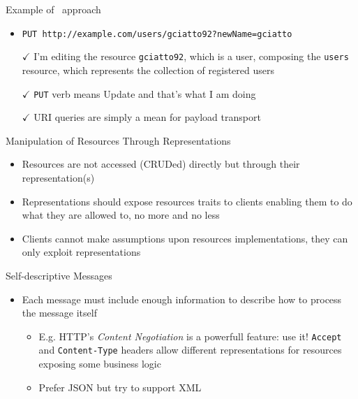 \begin{frame}
	\begin{exampleblock}{Example of \restful\ approach}
		\begin{itemize}
			\item \texttt{PUT http://example.com/users/gciatto92?newName=gciatto}
			\item[]
			\item[$\checkmark$] I'm editing the resource \texttt{gciatto92}, which is a user, composing the \texttt{users} resource, which represents the collection of registered users 
			\item[$\checkmark$] \texttt{PUT} verb means Update and that's what I am doing
			\item[$\checkmark$] URI queries are simply a mean for payload transport
		\end{itemize}
	\end{exampleblock}	
	
	\framebreak
	
	\begin{block}{Manipulation of Resources Through Representations}
		
		\begin{itemize}
			\item Resources are not accessed (CRUDed) directly but through their representation(s)
			\item Representations should expose resources traits to clients enabling them to do what they are allowed to, no more and no less
			\item Clients cannot make assumptions upon resources implementations, they can only exploit representations
		\end{itemize}
	\end{block}
	
	\begin{block}{Self-descriptive Messages}
			
		\begin{itemize}
			\item Each message must include enough information to describe how to process the message itself
			\begin{itemize}
				\item E.g. HTTP's \emph{Content Negotiation} is a powerfull feature: use it! \texttt{Accept} and \texttt{Content-Type} headers allow different representations for resources exposing some business logic
				\item Prefer JSON but try to support XML
			\end{itemize}
			

\end{itemize}
\end{block}
\end{frame}
